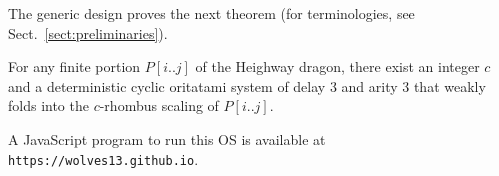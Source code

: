 The generic design proves the next theorem (for terminologies, see Sect.~\ref{sect:preliminaries}). 

\begin{theorem}\label{thm:main}
	For any finite portion $P[i..j]$ of the Heighway dragon, there exist an integer $c$ and a deterministic cyclic oritatami system of delay 3 and arity 3 that weakly folds into the $c$-rhombus scaling of $P[i..j]$. 
\end{theorem}

\noindent
A JavaScript program to run this OS is available at {\small {\tt https://wolves13.github.io}}. 

